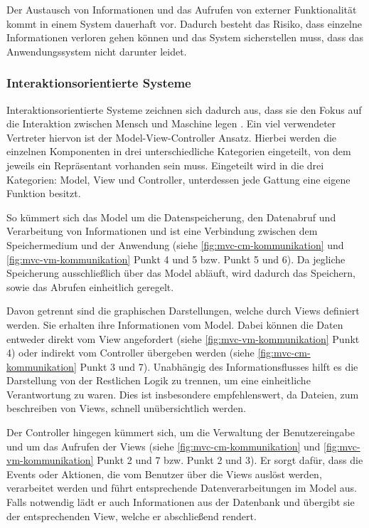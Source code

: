 
Der Austausch von Informationen und das Aufrufen von externer Funktionalität kommt in einem System dauerhaft vor. Dadurch besteht das Risiko, dass einzelne Informationen verloren gehen können und das System sicherstellen muss, dass das Anwendungssystem nicht darunter leidet.

\subsubsection{Interaktionsorientierte Systeme}

Interaktionsorientierte Systeme zeichnen sich dadurch aus, dass sie den Fokus auf die Interaktion zwischen Mensch und Maschine legen \parencite[vgl.][S. 124]{starke_effektive_2015}.
Ein viel verwendeter Vertreter hiervon ist der Model-View-Controller Ansatz. Hierbei werden die einzelnen Komponenten in drei unterschiedliche Kategorien eingeteilt, von dem jeweils ein Repräsentant vorhanden sein muss. Eingeteilt wird in die drei Kategorien: Model, View und Controller, unterdessen jede Gattung eine eigene Funktion besitzt.

So kümmert sich das Model um die Datenspeicherung, den Datenabruf und Verarbeitung von Informationen und ist eine Verbindung zwischen dem Speichermedium und der Anwendung (siehe \cref{fig:mvc-cm-kommunikation} und \cref{fig:mvc-vm-kommunikation} Punkt 4 und 5 bzw. Punkt 5 und 6). Da jegliche Speicherung ausschließlich über das Model abläuft, wird dadurch das Speichern, sowie das Abrufen einheitlich geregelt.

Davon getrennt sind die graphischen Darstellungen, welche durch Views definiert werden. Sie erhalten ihre Informationen vom Model. Dabei können die Daten entweder direkt vom View angefordert (siehe \cref{fig:mvc-vm-kommunikation} Punkt 4) oder indirekt vom Controller übergeben werden (siehe \cref{fig:mvc-cm-kommunikation} Punkt 3 und 7). Unabhängig des Informationsflusses hilft es die Darstellung von der Restlichen Logik zu trennen, um eine einheitliche Verantwortung zu waren. Dies ist insbesondere empfehlenswert, da Dateien, zum beschreiben von Views, schnell unübersichtlich werden.

Der Controller hingegen kümmert sich, um die Verwaltung der Benutzereingabe und um das Aufrufen der Views (siehe \cref{fig:mvc-cm-kommunikation} und \cref{fig:mvc-vm-kommunikation} Punkt 2 und 7 bzw. Punkt 2 und 3). Er sorgt dafür, dass die Events oder Aktionen, die vom Benutzer über die Views auslöst werden, verarbeitet werden und führt entsprechende Datenverarbeitungen im Model aus. Falls notwendig lädt er auch Informationen aus der Datenbank und übergibt sie der entsprechenden View, welche er abschließend rendert.

